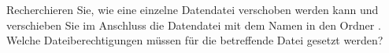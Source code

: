\item Recherchieren Sie, wie eine einzelne Datendatei verschoben
werden kann und verschieben Sie im Anschluss die Datendatei mit dem Namen
 in den Ordner . Welche Dateiberechtigungen
müssen für die betreffende Datei gesetzt werden?
